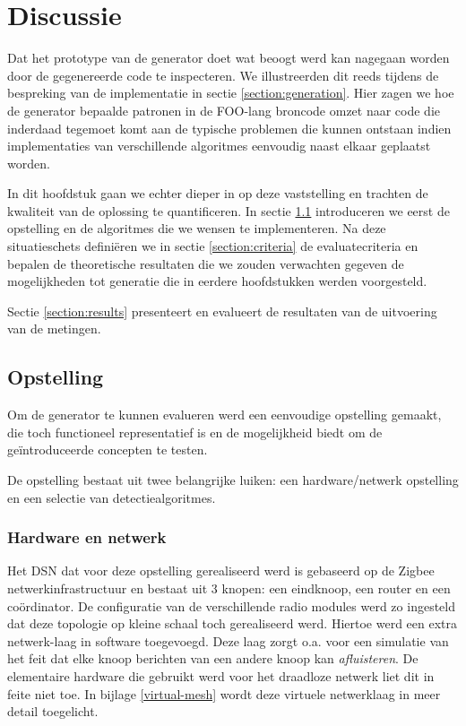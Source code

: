 
\chapter{Discussie}
\label{chapter:discussie}

Dat het prototype van de generator doet wat beoogt werd kan nagegaan worden
door de gegenereerde code te inspecteren. We illustreerden dit reeds tijdens de
bespreking van de implementatie in sectie \ref{section:generation}. Hier zagen
we hoe de generator bepaalde patronen in de FOO-lang broncode omzet naar code
die inderdaad tegemoet komt aan de typische problemen die kunnen ontstaan
indien implementaties van verschillende algoritmes eenvoudig naast elkaar
geplaatst worden.

In dit hoofdstuk gaan we echter dieper in op deze vaststelling en trachten de
kwaliteit van de oplossing te quantificeren. In sectie \ref{section:setup}
introduceren we eerst de opstelling en de algoritmes die we wensen te
implementeren. Na deze situatieschets defini\"eren we in sectie
\ref{section:criteria} de evaluatecriteria en bepalen de theoretische
resultaten die we zouden verwachten gegeven de mogelijkheden tot generatie die
in eerdere hoofdstukken werden voorgesteld.

Sectie \ref{section:results} presenteert en evalueert de resultaten van de
uitvoering van de metingen.

\section{Opstelling}
\label{section:setup}

Om de generator te kunnen evalueren werd een eenvoudige opstelling gemaakt, die
toch functioneel representatief is en de mogelijkheid biedt om de
ge\"introduceerde concepten te testen.

De opstelling bestaat uit twee belangrijke luiken: een hardware/netwerk
opstelling en een selectie van detectiealgoritmes.

\subsection{Hardware en netwerk}
\label{subsection:eval-hardware}

Het DSN dat voor deze opstelling gerealiseerd werd is gebaseerd op de Zigbee
netwerkinfrastructuur en bestaat uit 3 knopen: een eindknoop, een router en een
co\"ordinator. De configuratie van de verschillende radio modules werd zo
ingesteld dat deze topologie op kleine schaal toch gerealiseerd werd. Hiertoe
werd een extra netwerk-laag in software toegevoegd. Deze laag zorgt o.a. voor
een simulatie van het feit dat elke knoop berichten van een andere knoop kan
\emph{afluisteren}. De elementaire hardware die gebruikt werd voor het
draadloze netwerk liet dit in feite niet toe. In bijlage \ref{virtual-mesh}
wordt deze virtuele netwerklaag in meer detail toegelicht.


